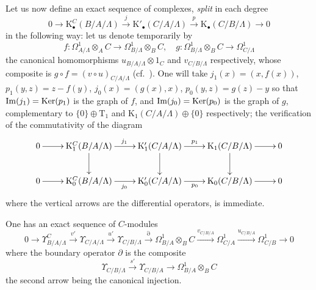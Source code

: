 \begin{env}[20.6.16]
\label{0.20.6.16}
Let us now define an exact sequence of complexes, \emph{split} in each degree
\begin{equation}
\tag{20.6.16.1}
  \label{0.20.6.16.1}
  0\to\mathrm{K}^C_\bullet(B/A/\Lambda)\xrightarrow{j}\mathrm{K}'_\bullet(C/A/\Lambda)\xrightarrow{p}\mathrm{K}_\bullet(C/B/\Lambda)\to 0
\end{equation}
in the following way: let us denote temporarily by
\[
  f:\Omega^1_{A/\Lambda}\otimes_A C\to\Omega^1_{B/\Lambda}\otimes_B C, \quad
  g:\Omega^1_{B/\Lambda}\otimes_B C\to\Omega^1_{C/\Lambda}
\]
the canonical homomorphisms $u_{B/A/\Lambda}\otimes 1_C$ and $v_{C/B/\Lambda}$ respectively, whose composite is $g\circ f=(v\circ u)_{C/A/\Lambda}$ (cf.\ ).
One will take $j_1(x)=(x,f(x))$, $p_1(y,z)=z-f(y)$, $j_0(x)=(g(x),x)$, $p_0(y,z)=g(z)-y$ so that $\operatorname{Im}(j_1)=\operatorname{Ker}(p_1)$ is the graph of $f$, and $\operatorname{Im}(j_0)=\operatorname{Ker}(p_0)$ is the graph of $g$, complementary to $\{0\}\oplus\mathrm{T}_1$ and $\mathrm{K}_1(C/A/\Lambda)\oplus\{0\}$ respectively; the verification of the commutativity of the diagram
\[
\xymatrix{
  0 \ar[r] & \mathrm{K}^C_1(B/A/\Lambda) \ar[r]^{j_1} \ar[d] & \mathrm{K}'_1(C/A/\Lambda) \ar[r]^{p_1} \ar[d] & \mathrm{K}_1(C/B/\Lambda) \ar[r] \ar[d] & 0 \\
  0 \ar[r] & \mathrm{K}^C_0(B/A/\Lambda) \ar[r]_{j_0} & \mathrm{K}'_0(C/A/\Lambda) \ar[r]_{p_0} & \mathrm{K}_0(C/B/\Lambda) \ar[r] & 0
}
\]
where the vertical arrows are the differential operators, is immediate.
\end{env}

\begin{theorem}[20.6.17]
\label{0.20.6.17}
One has an exact sequence of $C$-modules
\begin{equation}
\tag{20.6.17.1}
  \label{0.20.6.17.1}
  0\to\Upsilon^C_{B/A/\Lambda}\xrightarrow{v'}\Upsilon_{C/A/\Lambda}\xrightarrow{u'}\Upsilon_{C/B/\Lambda}\xrightarrow{\partial}\Omega^1_{B/A}\otimes_B C\xrightarrow{v_{C/B/A}}\Omega^1_{C/A}\xrightarrow{u_{C/B/A}}\Omega^1_{C/B}\to 0
\end{equation}
where the boundary operator $\partial$ is the composite
\begin{equation}
\tag{20.6.17.2}
  \label{0.20.6.17.2}
  \Upsilon_{C/B/\Lambda}\xrightarrow{s'}\Upsilon_{C/B/A}\to\Omega^1_{B/A}\otimes_B C
\end{equation}
the second arrow being the canonical injection.
\end{theorem}

